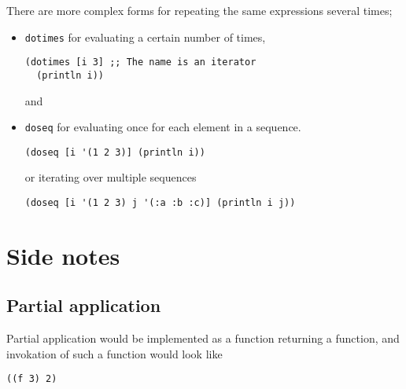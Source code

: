 \documentclass[11pt]{article}
\begin{document}
There are more complex forms for repeating the same expressions
several times;
\begin{itemize}
\item \texttt{dotimes} for evaluating a certain number of times,
\begin{verbatim}
(dotimes [i 3] ;; The name is an iterator
  (println i))
\end{verbatim}
and

\item \texttt{doseq} for evaluating once for each element in a sequence.
\begin{verbatim}
(doseq [i '(1 2 3)] (println i))
\end{verbatim}
or iterating over multiple sequences
\begin{verbatim}
(doseq [i '(1 2 3) j '(:a :b :c)] (println i j))
\end{verbatim}
\end{itemize}

\section{Side notes}
\label{sec:org8d6d39c}
\subsection{Partial application}
\label{sec:org51dccd4}
Partial application would be implemented as
a function returning a function,
and invokation of such a function would look like
\begin{verbatim}
((f 3) 2)
\end{verbatim}
\end{document}
